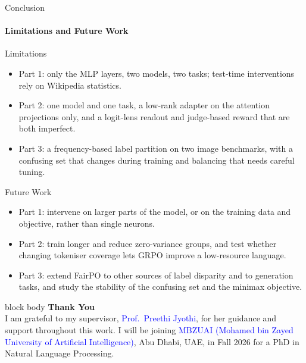 \documentclass[aspectratio=169]{beamer}
\newcommand{\partdivider}[2]{%
	\begin{frame}
		\vspace*{\fill}
		\begin{center}%
			\begin{minipage}{0.9\textwidth}
				\begin{beamercolorbox}[rounded=true,shadow=true,sep=18pt,center]{block body}
					{\color{sectionblue}\Large\textbf{#1}}\\[0.6em]
					{\color{black!70}\normalsize #2}
				\end{beamercolorbox}
			\end{minipage}%
		\end{center}
		\vspace*{\fill}
	\end{frame}%
}
\begin{document}
\begin{frame}{Conclusion}
	\framesubtitle{Limitations and Future Work}
	\begin{block}{\scriptsize Limitations}\scriptsize
		\begin{itemize}
			\item Part 1: only the MLP layers, two models, two tasks; test-time interventions rely on Wikipedia statistics.
			\item Part 2: one model and one task, a low-rank adapter on the attention projections only, and a logit-lens readout and judge-based reward that are both imperfect.
			\item Part 3: a frequency-based label partition on two image benchmarks, with a confusing set that changes during training and balancing that needs careful tuning.
		\end{itemize}
	\end{block}
	\begin{block}{\scriptsize Future Work}\scriptsize
		\begin{itemize}
			\item Part 1: intervene on larger parts of the model, or on the training data and objective, rather than single neurons.
			\item Part 2: train longer and reduce zero-variance groups, and test whether changing tokeniser coverage lets GRPO improve a low-resource language.
			\item Part 3: extend FairPO to other sources of label disparity and to generation tasks, and study the stability of the confusing set and the minimax objective.
		\end{itemize}
	\end{block}
\end{frame}
	
	\partdivider{Thank You}{I am grateful to my supervisor, \textcolor{blue}{Prof.~Preethi Jyothi}, for her guidance and support throughout this work.
		I will be joining \textcolor{blue}{MBZUAI (Mohamed bin Zayed University of Artificial Intelligence)}, Abu Dhabi, UAE, in Fall 2026 for a PhD in Natural Language Processing.}
	
\end{document}
